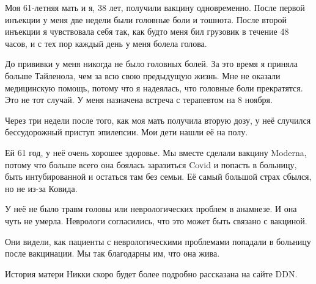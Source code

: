 Моя 61-летняя мать и я, 38 лет, получили вакцину одновременно. После первой
инъекции у меня две недели были головные боли и тошнота. После второй инъекции я
чувствовала себя так, как будто меня бил грузовик в течение 48 часов, и с тех
пор каждый день у меня болела голова.

До прививки у меня никогда не было головных болей. За это время я приняла больше
Тайленола, чем за всю свою предыдущую жизнь. Мне не оказали медицинскую помощь,
потому что я надеялась, что головные боли прекратятся. Это не тот случай. У меня
назначена встреча с терапевтом на 8 ноября.

Через три недели после того, как моя мать получила вторую дозу, у неё случился
бессудорожный приступ эпилепсии. Мои дети нашли её на полу.

Ей 61 год, у неё очень хорошее здоровье. Мы вместе сделали вакцину Moderna,
потому что больше всего она боялась заразиться Covid и попасть в больницу, быть
интубированной и остаться там без семьи. Её самый большой страх сбылся, но не
из-за Ковида.

У неё не было травм головы или неврологических проблем в анамнезе. И она чуть не
умерла. Неврологи согласились, что это может быть связано с вакциной.

Они видели, как пациенты с неврологическими проблемами попадали в больницу после
вакцинации. Мы так благодарны им, что она жива.

История матери Никки скоро будет более подробно рассказана на сайте DDN.
